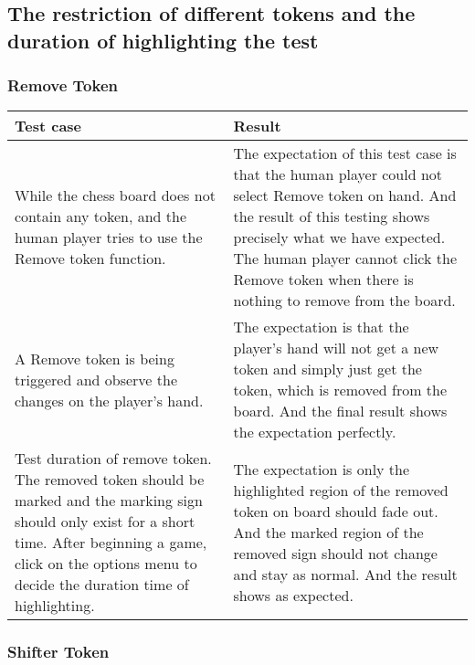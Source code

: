 \subsection{The restriction of different tokens and the duration of highlighting the test }

\subsubsection{Remove Token}	
\begin{table}[h]
	\centering
	\begin{tabular}{p{7cm}@{\hskip 5mm}  p{7cm}} 
		\toprule
		Test case   & Result   \\ 
		\midrule
		\midrule
		While the chess board does not contain any token, and the human player tries to use the Remove token function. & The expectation of this test case is that the human player could not select Remove token on hand. And the result of this testing shows precisely what we have expected. The human player cannot click the Remove token when there is nothing to remove from the board.  \\ 
		\midrule
		A Remove token is being triggered and observe the changes on the player's hand. & The expectation is that the player's hand will not get a new token and simply just get the token, which is removed from the board. And the final result shows the expectation perfectly.  \\
		\midrule
		Test duration of remove token. The removed token should be marked and the marking sign should only exist for a short time. After beginning a game, click on the options menu to decide the duration time of highlighting. & The expectation is only the highlighted region of the removed token on board should fade out. And the marked region of the removed sign should not change and stay as normal. And the result shows as expected. \\
		\bottomrule
	\end{tabular}
\end{table}
\newpage
\subsubsection{Shifter Token}

